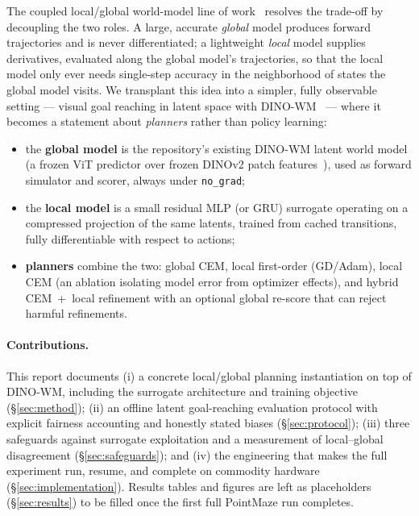\documentclass[11pt,a4paper]{article}
\begin{document}
The coupled local/global world-model line of work~\cite{fog2026} resolves the
trade-off by decoupling the two roles. A large, accurate \emph{global} model
produces forward trajectories and is never differentiated; a lightweight
\emph{local} model supplies derivatives, evaluated along the global model's
trajectories, so that the local model only ever needs single-step accuracy in
the neighborhood of states the global model visits. We transplant this idea
into a simpler, fully observable setting --- visual goal reaching in latent
space with DINO-WM~\cite{dinowm2025} --- where it becomes a statement about
\emph{planners} rather than policy learning:

\begin{itemize}[leftmargin=1.4em]
  \item the \textbf{global model} is the repository's existing DINO-WM latent
        world model (a frozen ViT predictor over frozen DINOv2 patch
        features~\cite{dinov2}), used as forward simulator and scorer, always
        under \texttt{no\_grad};
  \item the \textbf{local model} is a small residual MLP (or GRU) surrogate
        operating on a compressed projection of the same latents, trained from
        cached transitions, fully differentiable with respect to actions;
  \item \textbf{planners} combine the two: global CEM, local first-order
        (GD/Adam), local CEM (an ablation isolating model error from optimizer
        effects), and hybrid CEM~+~local refinement with an optional global
        re-score that can reject harmful refinements.
\end{itemize}

\paragraph{Contributions.} This report documents (i) a concrete
local/global planning instantiation on top of DINO-WM, including the surrogate
architecture and training objective (\S\ref{sec:method}); (ii) an offline
latent goal-reaching evaluation protocol with explicit fairness accounting and
honestly stated biases (\S\ref{sec:protocol}); (iii) three safeguards against
surrogate exploitation and a measurement of local--global disagreement
(\S\ref{sec:safeguards}); and (iv) the engineering that makes the full
experiment run, resume, and complete on commodity hardware
(\S\ref{sec:implementation}). Results tables and figures are left as
placeholders (\S\ref{sec:results}) to be filled once the first full PointMaze
run completes.
\end{document}
